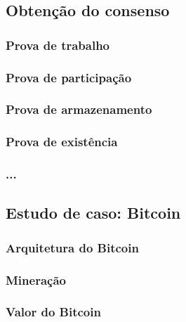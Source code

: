 \documentclass[tcc,capa]{texufpel}
\begin{document}

	\subsection{Obtenção do consenso}
    
    	\subsubsection{Prova de trabalho}
        
        \subsubsection{Prova de participação}
        
        \subsubsection{Prova de armazenamento}
        
        \subsubsection{Prova de existência}
        
        \subsubsection{...}
        

	\subsection{Estudo de caso: Bitcoin}
    
    	\subsubsection{Arquitetura do Bitcoin}
        
        \subsubsection{Mineração}
        
        \subsubsection{Valor do Bitcoin}
\end{document}
